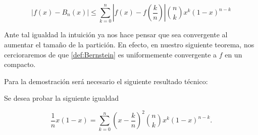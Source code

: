 \begin{equation} \label{eq:eq:Bernstein_diferencia}
    |f(x)-B_n(x)| \leq \sum_{k=0}^n \left|f(x) - f \left( \frac{k}{n} \right)\right|
    \binom{n}{k} x^{k} (1-x)^{n-k}
\end{equation} 

Ante tal igualdad la intuición ya nos
hace pensar que sea convergente al aumentar el tamaño de la partición.
 En efecto, en nuestro siguiente teorema, nos cercioraremos de que \ref{def:Bernstein}
 es uniformemente convergente a $f$ en un compacto. 

Para la demostración será necesario el siguiente resultado técnico: 
\begin{lema}
    Se desea probar la siguiente igualdad 

    \begin{equation} \label{eq:binomio_segunda_suma}
        \frac{1}{n} x (1-x)= \sum_{k=0}^{n}  \left( x-\frac{k}{n} \right)^2  \binom{n}{k} x^{k} (1-x)^{n-k}.
     \end{equation}
\end{lema}
